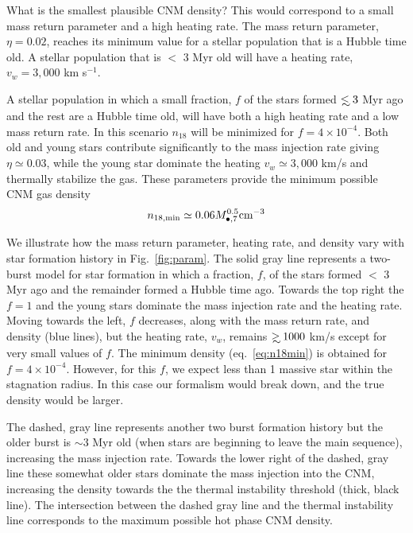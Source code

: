 \documentclass[usenatbib,fleqn]{mnras}
\newcommand\lsim{\mathrel{\rlap{\lower4pt\hbox{\hskip1pt$\sim$}}
    \raise1pt\hbox{$<$}}}
\newcommand\gsim{\mathrel{\rlap{\lower4pt\hbox{\hskip1pt$\sim$}}
    \raise1pt\hbox{$>$}}}
\newcommand{\Mbh}[1][]{M_{\bullet#1}}
\begin{document}
What is the smallest plausible CNM density? This would correspond to a
small mass return parameter and a high heating rate. The mass return
parameter, $\eta=0.02$, reaches its minimum value for a stellar
population that is a Hubble time old. A stellar population
that is $<$ 3 Myr old will have a heating rate, $v_w=3,000$ km s$^{-1}$.

A stellar population in which a small fraction, $f$ of the stars
formed $\lsim 3$ Myr ago and the rest are a Hubble time old, will have
both a high heating rate and a low mass return rate. In this scenario
$n_{18}$ will be minimized for $f=4\times 10^{-4}$. Both old and young
stars contribute significantly to the mass injection rate giving
$\eta\simeq 0.03$, while the young star dominate the heating
$v_w\simeq 3,000$ km/s and thermally stabilize the gas. These
parameters provide the minimum possible CNM gas density
\begin{equation}
n_{\rm 18,min}\simeq 0.06 \Mbh[,7]^{0.5} {\rm cm^{-3}}
\label{eq:n18min}
\end{equation}

We illustrate how the mass return parameter, heating rate, and density
vary with star formation history in Fig.~\ref{fig:param}. The solid
gray line represents a two-burst model for star formation in which a
fraction, $f$, of the stars formed $<$ 3 Myr ago and the remainder
formed a Hubble time ago.  Towards the top right the
$f=1$ and the young stars dominate the mass injection rate and the
heating rate.  Moving towards the left, $f$ decreases, along with the
mass return rate, and density (blue lines), but the heating rate,
$v_w$, remains $\gsim 1000$ km/s except for very small values of
$f$. The minimum density (eq.~\eqref {eq:n18min}) is obtained for
$f=4\times 10^{-4}$. However, for this $f$, we expect less than 1
massive star within the stagnation radius. In this case our formalism
would break down, and the true density would be larger.

The dashed, gray line represents another two burst formation history
but the older burst is $\sim 3$ Myr old (when stars are beginning to
leave the main sequence), increasing the mass injection rate. Towards
the lower right of the dashed, gray line these somewhat older stars
dominate the mass injection into the CNM, increasing the density
towards the the thermal instability threshold (thick, black line). The
intersection between the dashed gray line and the thermal instability
line corresponds to the maximum possible hot phase CNM density.
\end{document}
